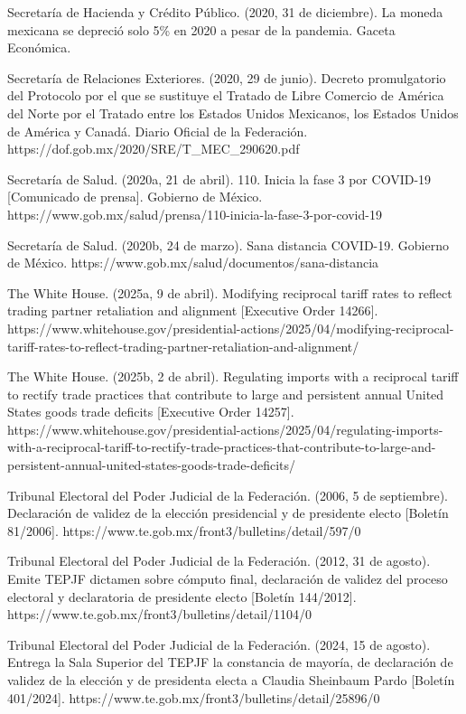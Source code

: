 \begin{referencias}
Secretaría de Hacienda y Crédito Público. (2020, 31 de diciembre). La moneda mexicana se depreció solo 5\% en 2020 a pesar de la pandemia. Gaceta Económica.

Secretaría de Relaciones Exteriores. (2020, 29 de junio). Decreto promulgatorio del Protocolo por el que se sustituye el Tratado de Libre Comercio de América del Norte por el Tratado entre los Estados Unidos Mexicanos, los Estados Unidos de América y Canadá. Diario Oficial de la Federación. https://dof.gob.mx/2020/SRE/T\_MEC\_290620.pdf

Secretaría de Salud. (2020a, 21 de abril). 110. Inicia la fase 3 por COVID-19 {[}Comunicado de prensa{]}. Gobierno de México. https://www.gob.mx/salud/prensa/110-inicia-la-fase-3-por-covid-19

Secretaría de Salud. (2020b, 24 de marzo). Sana distancia COVID-19. Gobierno de México. https://www.gob.mx/salud/documentos/sana-distancia

The White House. (2025a, 9 de abril). Modifying reciprocal tariff rates to reflect trading partner retaliation and alignment {[}Executive Order 14266{]}. https://www.whitehouse.gov/presidential-actions/2025/04/modifying-reciprocal-tariff-rates-to-reflect-trading-partner-retaliation-and-alignment/

The White House. (2025b, 2 de abril). Regulating imports with a reciprocal tariff to rectify trade practices that contribute to large and persistent annual United States goods trade deficits {[}Executive Order 14257{]}. https://www.whitehouse.gov/presidential-actions/2025/04/regulating-imports-with-a-reciprocal-tariff-to-rectify-trade-practices-that-contribute-to-large-and-persistent-annual-united-states-goods-trade-deficits/

Tribunal Electoral del Poder Judicial de la Federación. (2006, 5 de septiembre). Declaración de validez de la elección presidencial y de presidente electo {[}Boletín 81/2006{]}. https://www.te.gob.mx/front3/bulletins/detail/597/0

Tribunal Electoral del Poder Judicial de la Federación. (2012, 31 de agosto). Emite TEPJF dictamen sobre cómputo final, declaración de validez del proceso electoral y declaratoria de presidente electo {[}Boletín 144/2012{]}. https://www.te.gob.mx/front3/bulletins/detail/1104/0

Tribunal Electoral del Poder Judicial de la Federación. (2024, 15 de agosto). Entrega la Sala Superior del TEPJF la constancia de mayoría, de declaración de validez de la elección y de presidenta electa a Claudia Sheinbaum Pardo {[}Boletín 401/2024{]}. https://www.te.gob.mx/front3/bulletins/detail/25896/0
\end{referencias}

